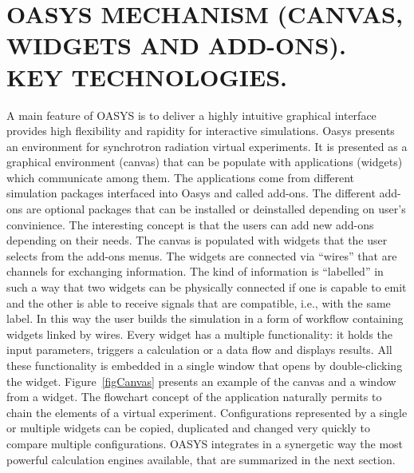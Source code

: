\documentclass{aip-cp}
\begin{document}
\section{OASYS MECHANISM (CANVAS, WIDGETS AND ADD-ONS). KEY TECHNOLOGIES.}

A main feature of OASYS is to deliver a highly intuitive graphical interface provides high flexibility and rapidity for interactive simulations. Oasys presents an environment for synchrotron radiation virtual experiments. It is presented as a graphical environment (canvas) that can be populate with applications (widgets) which communicate among them. The applications come from different simulation packages interfaced into Oasys and called add-ons. The different add-ons are optional packages that can be installed or deinstalled depending on user's convinience. The interesting concept is that the users can add new add-ons depending on their needs. The canvas is populated with widgets that the user selects from the add-ons menus. The widgets are connected via ``wires'' that are channels for exchanging information. The kind of information is ``labelled'' in such a way that two widgets can be physically connected if one is capable to emit and the other is able to receive signals that are compatible, i.e., with the same label. In this way the user builds the simulation in a form of workflow containing widgets linked by wires. Every widget has a multiple functionality: it holds the input parameters, triggers a calculation or a data flow and displays results. All these functionality is embedded in a single window that opens by double-clicking the widget. Figure~\ref{figCanvas} presents an example of the canvas and a window from a widget. 
The flowchart concept of the application naturally permits to chain the elements of a virtual experiment. Configurations represented by a single or multiple widgets can be copied, duplicated and changed very quickly to compare multiple configurations. OASYS integrates in a synergetic way the most powerful calculation engines available, that are summarized in the next section. 
\end{document}
